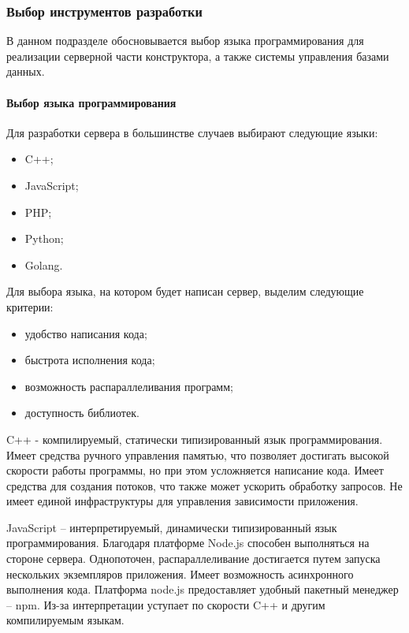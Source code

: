 
\subsubsection{Выбор инструментов разработки}

В данном подразделе обосновывается выбор языка программирования
для реализации серверной части конструктора, а также системы управления
базами данных.


\paragraph{Выбор языка программирования}

Для разработки сервера в большинстве случаев выбирают следующие
языки:

\begin{itemize}
	\item C++;
	\item JavaScript;
	\item PHP;
	\item Python;
	\item Golang.
\end{itemize}

Для выбора языка, на котором будет написан сервер, выделим
следующие критерии:

\begin{itemize}
	\item удобство написания кода;
	\item быстрота исполнения кода;
	\item возможность распараллеливания программ;
	\item доступность библиотек.
\end{itemize}

C++ - компилируемый, статически типизированный язык
программирования. Имеет средства ручного управления памятью, что
позволяет достигать высокой скорости работы программы, но при этом
усложняется написание кода. Имеет средства для создания потоков, что также
может ускорить обработку запросов. Не имеет единой инфраструктуры для
управления зависимости приложения.

JavaScript – интерпретируемый, динамически типизированный язык
программирования. Благодаря платформе Node.js способен выполняться на
стороне сервера. Однопоточен, распараллеливание достигается путем запуска
нескольких экземпляров приложения. Имеет возможность асинхронного
выполнения кода. Платформа node.js предоставляет удобный пакетный
менеджер – npm. Из-за интерпретации уступает по скорости C++ и другим
компилируемым языкам.

